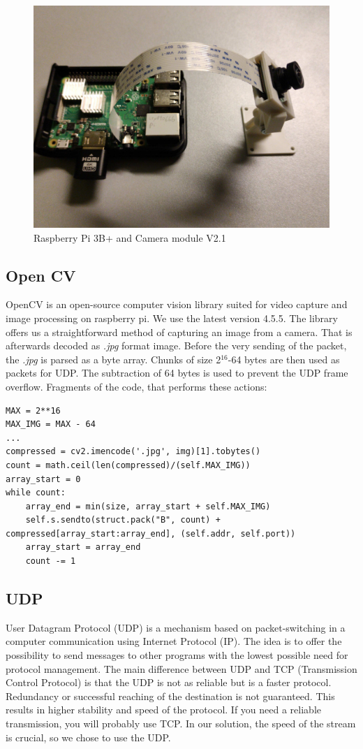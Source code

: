 \documentclass{ctuthesis}
\begin{document}
\begin{figure}[H]
	\centering
	\includegraphics[width=0.8\linewidth]{rPi.jpeg}
	\caption{Raspberry Pi 3B+ and Camera module V2.1}
	\label{fig:raspberry}
\end{figure}

\subsection{Open CV}
OpenCV is an open-source computer vision library suited for video capture and image processing on raspberry pi\cite{3}. We use the latest version 4.5.5. The library offers us a straightforward method of capturing an image from a camera. That is afterwards decoded as \textit{.jpg} format image. Before the very sending of the packet, the \textit{.jpg} is parsed as a byte array. Chunks of size 2$^{16}$-64 bytes are then used as packets for UDP. The subtraction of 64 bytes is used to prevent the UDP frame overflow. Fragments of the code, that performs these actions:

\begin{lstlisting}
MAX = 2**16
MAX_IMG = MAX - 64
...
compressed = cv2.imencode('.jpg', img)[1].tobytes()
count = math.ceil(len(compressed)/(self.MAX_IMG))
array_start = 0
while count:
    array_end = min(size, array_start + self.MAX_IMG)
    self.s.sendto(struct.pack("B", count) + compressed[array_start:array_end], (self.addr, self.port))
    array_start = array_end
    count -= 1
\end{lstlisting}

\subsection{UDP}
User Datagram Protocol (UDP)  is a mechanism based on packet-switching in a computer communication using Internet Protocol (IP)\cite{4}. The idea is to offer the possibility to send messages to other programs with the lowest possible need for protocol management. The main difference between UDP and TCP (Transmission Control Protocol) is that the UDP is not as reliable but is a faster protocol. Redundancy or successful reaching of the destination is not guaranteed. This results in higher stability and speed of the protocol. If you need a reliable transmission, you will probably use TCP\cite{5}. In our solution, the speed of the stream is crucial, so we chose to use the UDP. 
\end{document}
